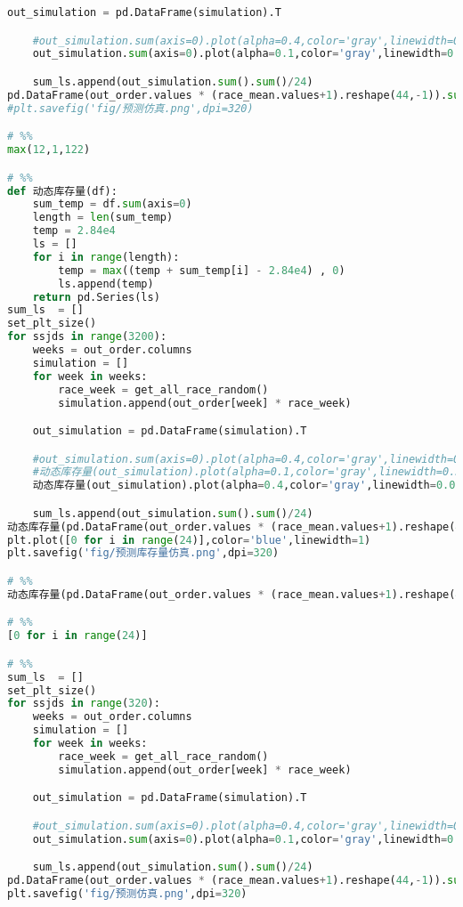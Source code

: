 \begin{appendices}
\begin{lstlisting}[language=python]
    out_simulation = pd.DataFrame(simulation).T

    #out_simulation.sum(axis=0).plot(alpha=0.4,color='gray',linewidth=0.05)
    out_simulation.sum(axis=0).plot(alpha=0.1,color='gray',linewidth=0.5)

    sum_ls.append(out_simulation.sum().sum()/24)
pd.DataFrame(out_order.values * (race_mean.values+1).reshape(44,-1)).sum().plot(color='r',linewidth=2)
#plt.savefig('fig/预测仿真.png',dpi=320)

# %%
max(12,1,122)

# %%
def 动态库存量(df):
    sum_temp = df.sum(axis=0)
    length = len(sum_temp)
    temp = 2.84e4
    ls = []
    for i in range(length):
        temp = max((temp + sum_temp[i] - 2.84e4) , 0)
        ls.append(temp)
    return pd.Series(ls)
sum_ls  = []
set_plt_size()
for ssjds in range(3200):
    weeks = out_order.columns
    simulation = []
    for week in weeks:
        race_week = get_all_race_random()
        simulation.append(out_order[week] * race_week)

    out_simulation = pd.DataFrame(simulation).T

    #out_simulation.sum(axis=0).plot(alpha=0.4,color='gray',linewidth=0.05)
    #动态库存量(out_simulation).plot(alpha=0.1,color='gray',linewidth=0.5)
    动态库存量(out_simulation).plot(alpha=0.4,color='gray',linewidth=0.05)

    sum_ls.append(out_simulation.sum().sum()/24)
动态库存量(pd.DataFrame(out_order.values * (race_mean.values+1).reshape(44,-1))).plot(color='r',linewidth=2)
plt.plot([0 for i in range(24)],color='blue',linewidth=1)
plt.savefig('fig/预测库存量仿真.png',dpi=320)

# %%
动态库存量(pd.DataFrame(out_order.values * (race_mean.values+1).reshape(44,-1)))

# %%
[0 for i in range(24)]

# %%
sum_ls  = []
set_plt_size()
for ssjds in range(320):
    weeks = out_order.columns
    simulation = []
    for week in weeks:
        race_week = get_all_race_random()
        simulation.append(out_order[week] * race_week)

    out_simulation = pd.DataFrame(simulation).T

    #out_simulation.sum(axis=0).plot(alpha=0.4,color='gray',linewidth=0.05)
    out_simulation.sum(axis=0).plot(alpha=0.1,color='gray',linewidth=0.5)

    sum_ls.append(out_simulation.sum().sum()/24)
pd.DataFrame(out_order.values * (race_mean.values+1).reshape(44,-1)).sum().plot(color='r',linewidth=2)
plt.savefig('fig/预测仿真.png',dpi=320)


\end{lstlisting}
\end{appendices}
